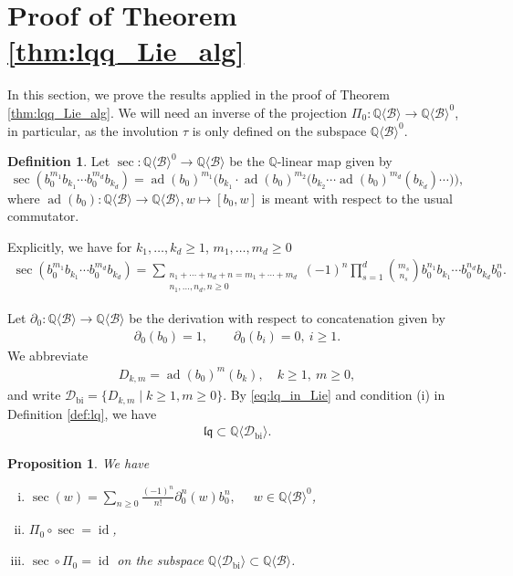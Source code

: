 \documentclass[12pt,reqno]{amsart}
\newtheorem{prop}[thm]{Proposition}
\numberwithin{equation}{section}
\theoremstyle{definition}
\newtheorem{defi}[thm]{Definition}
\newcommand{\QQ}{\mathbb{Q}}
\newcommand{\ad}{\operatorname{ad}}
\newcommand{\id}{\operatorname{id}}
\newcommand{\B}{\mathcal{B}}
\newcommand{\QB}{\QQ\langle \B\rangle}
\newcommand{\Dbi}{\mathcal{D}_{\operatorname{bi}}}
\newcommand{\QDbi}{\QQ\langle \Dbi\rangle}
\newcommand{\lqq}{\mathfrak{lq}}
\newcommand{\pizero}{\Pi_0}
\begin{document}
\section{Proof of Theorem \ref{thm:lqq_Lie_alg}} \label{sec:lq_Lie_alg_proof}

In this section, we prove the results applied in the proof of Theorem \ref{thm:lqq_Lie_alg}.
We will need an inverse of the projection $\pizero:\QB\to \QB^0$, in particular, as the involution $\tau$ is only defined on the subspace $\QB^0$.

\begin{defi} \label{def:sec} Let $\sec:\QB^0\to \QB$ be the $\QQ$-linear map given by
\[\sec(b_0^{m_1}b_{k_1}\cdots b_0^{m_d}b_{k_d})=\ad(b_0)^{m_1}\Big(b_{k_1}\cdot \ad(b_0)^{m_2}\Big(b_{k_2}\cdots \ad(b_0)^{m_d}(b_{k_d})\cdots\Big)\Big),\]
where $\ad(b_0):\QB\to \QB, w\mapsto[b_0,w]$ is meant with respect to the usual commutator.
\end{defi}

Explicitly, we have for $k_1,\ldots,k_d\geq1$, $m_1,\ldots,m_d\geq0$
\begin{align} \label{eq:sec_expl}
\sec(b_0^{m_1}b_{k_1}\cdots b_0^{m_d}b_{k_d})=\sum_{\substack{n_1+\cdots+n_d+n=m_1+\cdots+m_d \\ n_1,\ldots,n_d,n\geq0}} (-1)^n \prod_{s=1}^d \binom{m_s}{n_s} b_0^{n_1}b_{k_1}\cdots b_0^{n_d}b_{k_d}b_0^n.
\end{align}

Let $\partial_0:\QB\to \QB$ be the derivation with respect to concatenation given by 
\begin{align} \label{eq:def_d0}
\partial_0(b_0)=1,\qquad \partial_0(b_i)=0,\ i\geq1.
\end{align}
We abbreviate 
\begin{align} \label{eq:def_Dbi}
D_{k,m}=\ad(b_0)^m(b_k),\quad k\geq1,\ m\geq0,
\end{align}
and write $\Dbi=\{D_{k,m}\mid k\geq1,m\geq0\}$. By \eqref{eq:lq_in_Lie} and condition (i) in Definition \ref{def:lq}, we have 
\begin{align} \label{eq:lq_in_QDbi}
\lqq\subset \QDbi.
\end{align} 

\begin{prop} \label{prop:pi0_sec_inverse} We have
\begin{enumerate}[(i)] \setlength\itemsep{0.4em}
\item $\sec(w) = \sum\limits_{n\geq0} \frac{(-1)^n}{n!} \partial_0^n(w)b_0^n,\quad$ $w\in \QB^0$,
\item $\pizero\circ \sec=\id$,
\item $\sec\circ \pizero=\id$ on the subspace $\QDbi\subset \QB$.
\end{enumerate}
\end{prop}
\end{document}
